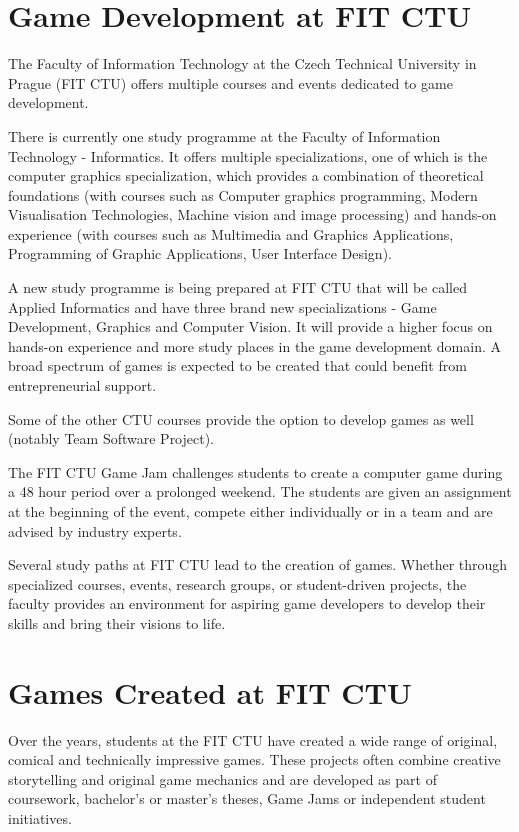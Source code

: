 \section{Game Development at FIT CTU}
The Faculty of Information Technology at the Czech Technical University in Prague (FIT CTU) offers multiple courses and events dedicated to game development. 

There is currently one study programme at the Faculty of Information Technology - Informatics. It offers multiple specializations, one of which is the computer graphics specialization, which provides a combination of theoretical foundations (with courses such as Computer graphics programming, Modern Visualisation Technologies, Machine vision and image processing) and hands-on experience (with courses such as Multimedia and Graphics Applications, Programming of Graphic Applications, User Interface Design).

A new study programme is being prepared at FIT CTU that will be called Applied Informatics and have three brand new specializations - Game Development, Graphics and Computer Vision. It will provide a higher focus on hands-on experience and more study places in the game development domain. A broad spectrum of games is expected to be created that could benefit from entrepreneurial support.

Some of the other CTU courses provide the option to develop games as well (notably Team Software Project).

The FIT CTU Game Jam challenges students to create a computer game during a 48 hour period over a prolonged weekend. The students are given an assignment at the beginning of the event, compete either individually or in a team and are advised by industry experts.

Several study paths at FIT CTU lead to the creation of games. Whether through specialized courses, events, research groups, or student-driven projects, the faculty provides an environment for aspiring game developers to develop their skills and bring their visions to life.

\section{Games Created at FIT CTU}
Over the years, students at the FIT CTU have created a wide range of original, comical and technically impressive games. These projects often combine creative storytelling and original game mechanics and are developed as part of coursework, bachelor’s or master’s theses, Game Jams or independent student initiatives.

